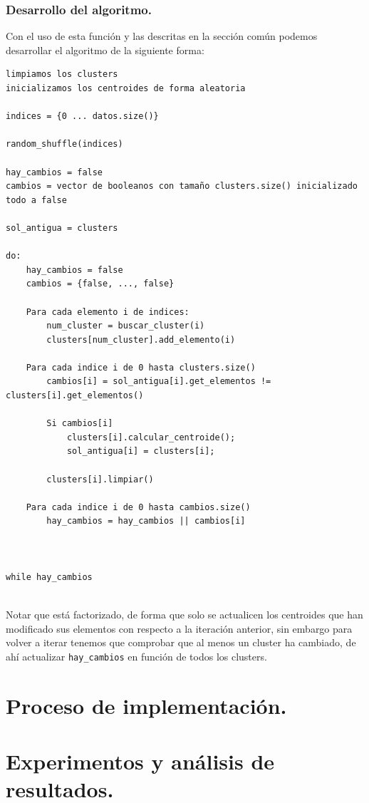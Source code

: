 \documentclass[12pt, spanish]{article}
\begin{document}
\subsubsection{Desarrollo del algoritmo.}

Con el uso de esta función y las descritas en la sección común podemos desarrollar el algoritmo de la siguiente forma:

\begin{lstlisting}
limpiamos los clusters
inicializamos los centroides de forma aleatoria

indices = {0 ... datos.size()}

random_shuffle(indices)

hay_cambios = false
cambios = vector de booleanos con tamaño clusters.size() inicializado todo a false

sol_antigua = clusters

do:
	hay_cambios = false
	cambios = {false, ..., false}
	
	Para cada elemento i de indices:
		num_cluster = buscar_cluster(i)
		clusters[num_cluster].add_elemento(i)
		
	Para cada indice i de 0 hasta clusters.size()
		cambios[i] = sol_antigua[i].get_elementos != clusters[i].get_elementos()
		
		Si cambios[i]
			clusters[i].calcular_centroide();
			sol_antigua[i] = clusters[i];
			
		clusters[i].limpiar()
		
	Para cada indice i de 0 hasta cambios.size()
		hay_cambios = hay_cambios || cambios[i]



while hay_cambios


\end{lstlisting}

Notar que está factorizado, de forma que solo se actualicen los centroides que han modificado sus elementos con respecto a la iteración anterior, sin embargo para volver a iterar tenemos que comprobar que al menos un cluster ha cambiado, de ahí actualizar \texttt{hay\_cambios} en función de todos los clusters.

\section{Proceso de implementación.}


\section{Experimentos y análisis de resultados.}
\end{document}
